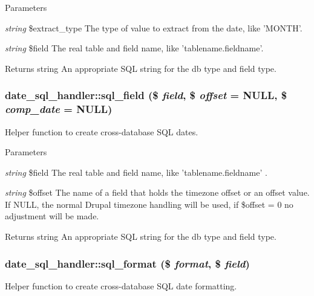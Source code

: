 \begin{DoxyParams}{Parameters}
\item[{\em string}]\$extract\_\-type The type of value to extract from the date, like 'MONTH'. \item[{\em string}]\$field The real table and field name, like 'tablename.fieldname'.\end{DoxyParams}
\begin{DoxyReturn}{Returns}
string An appropriate SQL string for the db type and field type. 
\end{DoxyReturn}
\hypertarget{classdate__sql__handler_aab48696c365846196f8ff2ecb105d010}{
\subsubsection[{sql\_\-field}]{\setlength{\rightskip}{0pt plus 5cm}date\_\-sql\_\-handler::sql\_\-field (\$ {\em field}, \/  \$ {\em offset} = {\ttfamily NULL}, \/  \$ {\em comp\_\-date} = {\ttfamily NULL})}}
\label{classdate__sql__handler_aab48696c365846196f8ff2ecb105d010}
Helper function to create cross-\/database SQL dates.


\begin{DoxyParams}{Parameters}
\item[{\em string}]\$field The real table and field name, like 'tablename.fieldname' . \item[{\em string}]\$offset The name of a field that holds the timezone offset or an offset value. If NULL, the normal Drupal timezone handling will be used, if \$offset = 0 no adjustment will be made.\end{DoxyParams}
\begin{DoxyReturn}{Returns}
string An appropriate SQL string for the db type and field type. 
\end{DoxyReturn}
\hypertarget{classdate__sql__handler_ab64ba4906fa0a61312a2bc3072275243}{
\subsubsection[{sql\_\-format}]{\setlength{\rightskip}{0pt plus 5cm}date\_\-sql\_\-handler::sql\_\-format (\$ {\em format}, \/  \$ {\em field})}}
\label{classdate__sql__handler_ab64ba4906fa0a61312a2bc3072275243}
Helper function to create cross-\/database SQL date formatting.


